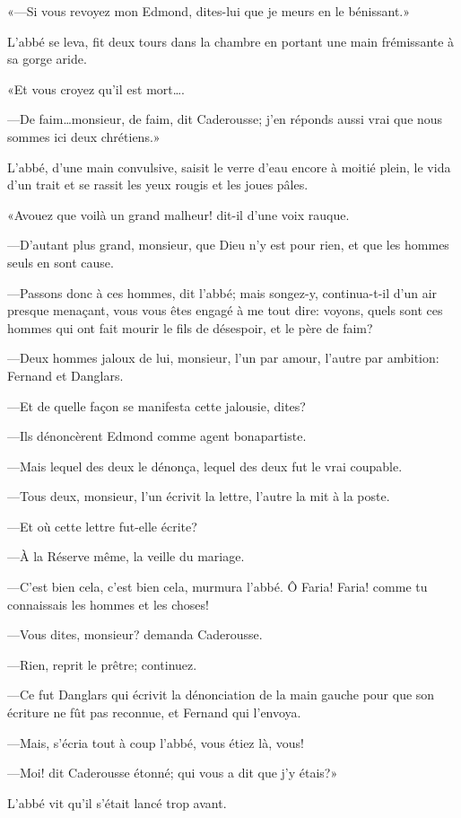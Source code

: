 «—Si vous revoyez mon Edmond, dites-lui que je meurs en le bénissant.»

L'abbé se leva, fit deux tours dans la chambre en portant une main frémissante à sa gorge aride.

«Et vous croyez qu'il est mort\dots.

—De faim\dots monsieur, de faim, dit Caderousse; j'en réponds aussi vrai que nous sommes ici deux chrétiens.»

L'abbé, d'une main convulsive, saisit le verre d'eau encore à moitié plein, le vida d'un trait et se rassit les yeux rougis et les joues pâles.

«Avouez que voilà un grand malheur! dit-il d'une voix rauque.

—D'autant plus grand, monsieur, que Dieu n'y est pour rien, et que les hommes seuls en sont cause.

—Passons donc à ces hommes, dit l'abbé; mais songez-y, continua-t-il d'un air presque menaçant, vous vous êtes engagé à me tout dire: voyons, quels sont ces hommes qui ont fait mourir le fils de désespoir, et le père de faim?

—Deux hommes jaloux de lui, monsieur, l'un par amour, l'autre par ambition: Fernand et Danglars.

—Et de quelle façon se manifesta cette jalousie, dites?

—Ils dénoncèrent Edmond comme agent bonapartiste.

—Mais lequel des deux le dénonça, lequel des deux fut le vrai coupable.

—Tous deux, monsieur, l'un écrivit la lettre, l'autre la mit à la poste.

—Et où cette lettre fut-elle écrite?

—À la Réserve même, la veille du mariage.

—C'est bien cela, c'est bien cela, murmura l'abbé. Ô Faria! Faria! comme tu connaissais les hommes et les choses!

—Vous dites, monsieur? demanda Caderousse.

—Rien, reprit le prêtre; continuez.

—Ce fut Danglars qui écrivit la dénonciation de la main gauche pour que son écriture ne fût pas reconnue, et Fernand qui l'envoya.

—Mais, s'écria tout à coup l'abbé, vous étiez là, vous!

—Moi! dit Caderousse étonné; qui vous a dit que j'y étais?»

L'abbé vit qu'il s'était lancé trop avant.


